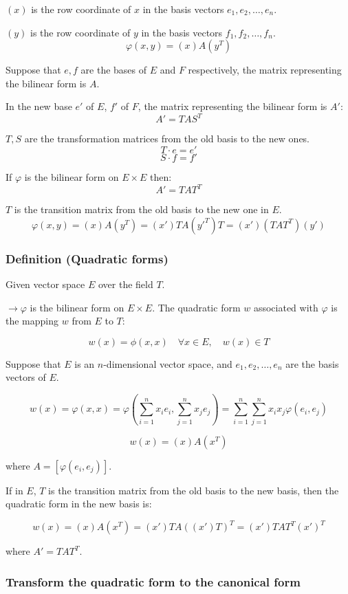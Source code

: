 $(x)$ is the row coordinate of $x$ in the basis vectors $e_1, e_2, \ldots, e_n$.

$(y)$ is the row coordinate of $y$ in the basis vectors $f_1, f_2, \ldots, f_n$.
\[
\varphi(x, y) = (x) A (y^T)
\]

Suppose that $e, f$ are the bases of $E$ and $F$ respectively, the matrix representing the bilinear form is $A$.

In the new base $e'$ of $E$, $f'$ of $F$, the matrix representing the bilinear form is $A'$:
\begin{equation*}
    A' = T A S^T
\end{equation*}


$T, S$ are the transformation matrices from the old basis to the new ones.
\[
T \cdot e = e'
\]
\[
S \cdot f = f'
\]

If $\varphi$ is the bilinear form on $E \times E$ then:
\[
A' = T A T^T
\]

$T$ is the transition matrix from the old basis to the new one in $E$.
\[
\varphi(x, y) = (x) A (y^T) = (x') T A (y'^T) T = (x') (T A T^T) (y')
\]


\subsubsection{Definition (Quadratic forms)}

Given vector space $E$ over the field $T$.

$\rightarrow\varphi$ is the bilinear form on $E \times E$.
The quadratic form $w$ associated with $\varphi$ is the mapping $w$ from $E$ to $T$:

\[
w(x) = \phi(x, x) \quad \forall x \in E, \quad w(x) \in T
\]

Suppose that $E$ is an $n$-dimensional vector space, and $e_1, e_2, \ldots, e_n$ are the basis vectors of $E$.

\[
w(x) = \varphi(x, x) = \varphi\left(\sum_{i=1}^n x_i e_i, \sum_{j=1}^n x_j e_j\right) = \sum_{i=1}^n \sum_{j=1}^n x_i x_j \varphi(e_i, e_j)
\]

\[
w(x) = (x) A (x^T)
\]

where $A = [\varphi(e_i, e_j)]$.

If in $E$, $T$ is the transition matrix from the old basis to the new basis, then the quadratic form in the new basis is:

\[
w(x) = (x) A (x^T) = (x')T A ((x')T)^T = (x')T AT^T (x')^T
\]

where $A' = T A T^T$.


\subsubsection{Transform the quadratic form to the canonical form}

